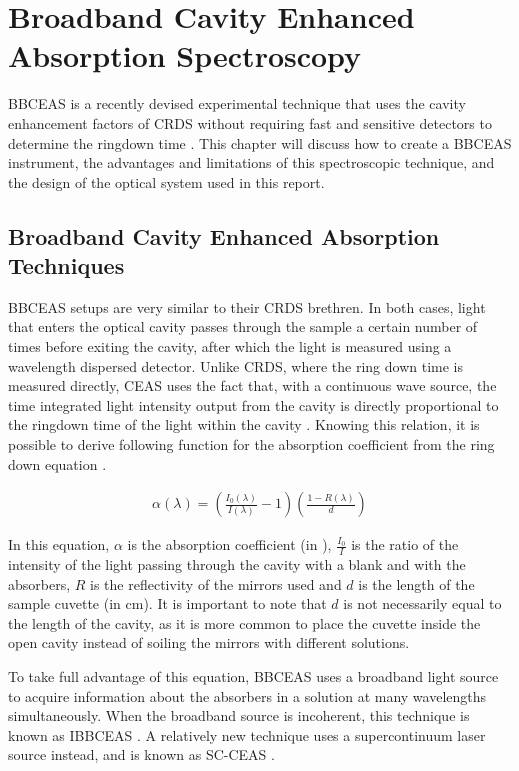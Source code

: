 \chapter{Broadband Cavity Enhanced Absorption Spectroscopy}\label{ch:bbceas}

\acf{BBCEAS} is a recently devised experimental technique that uses the cavity
enhancement factors of \ac{CRDS} without requiring fast and sensitive detectors
to determine the ringdown time \cite{Berden:2009wk}. This chapter  will discuss
how to create a \ac{BBCEAS} instrument, the advantages and limitations of this
spectroscopic technique, and the design of the optical system used in this
report.



\section{Broadband Cavity Enhanced Absorption Techniques}\label{sec:bbceas}

\acl{BBCEAS} setups are very similar to their \ac{CRDS} brethren. In both
cases, light that enters the optical cavity passes through the sample a certain
number of times before exiting the cavity, after which the light is measured
using a wavelength dispersed detector. Unlike \ac{CRDS}, where the ring down
time is measured directly, \ac{CEAS} uses the fact that, with a continuous wave
source, the time integrated light intensity output from the cavity is directly
proportional to the ringdown time of the light within the cavity
\cite{Engeln:1998uq}.  Knowing this relation, it is possible to derive
following function for the absorption coefficient from the ring down equation \cite{Berden:2009wk}.

  \begin{align*}
    \alpha(\lambda) =
    \left(\frac{I_0(\lambda)}{I(\lambda)}-1\right)\left(\frac{1-R(\lambda)}{d}\right)
  \end{align*}

In this equation, $\alpha$ is the absorption coefficient (in \icm),
$\frac{I_0}{I}$ is the ratio of the intensity of the light passing through the
cavity with a blank and with the absorbers, $R$ is the reflectivity of the
mirrors used and $d$ is the length of the sample cuvette (in cm). It is
important to note that $d$ is not necessarily equal to the length of the
cavity, as it is more common to place the cuvette inside the open cavity
instead of soiling the mirrors with different solutions.

To take full advantage of this equation, \ac{BBCEAS} uses a broadband light
source to acquire information about the absorbers in a solution at many
wavelengths simultaneously. When the broadband source is incoherent, this
technique is known as \acf{IBBCEAS} \cite{Berden:2009wk}. A relatively new
technique uses a supercontinuum laser source instead, and is known as
\acf{SC-CEAS} \cite{Kiwanuka:2010bj}.



